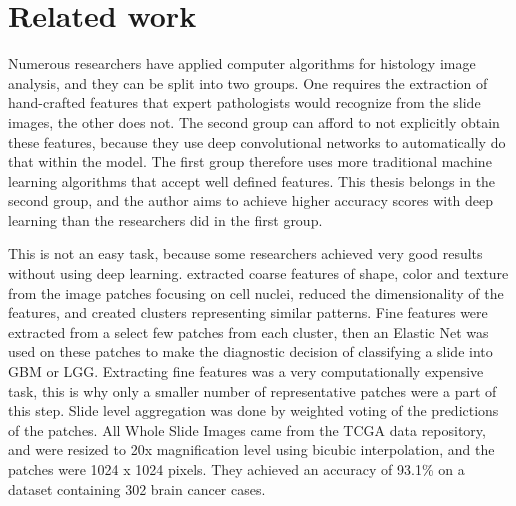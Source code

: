 
\chapter{Related work}
\label{cha:related_work}

Numerous researchers have applied computer algorithms for histology image analysis, and they can be split into two groups. One requires the extraction of hand-crafted features that expert pathologists would recognize from the slide images, the other does not. The second group can afford to not explicitly obtain these features, because they use deep convolutional networks to automatically do that within the model. The first group therefore uses more traditional machine learning algorithms that accept well defined features. This thesis belongs in the second group, and the author aims to achieve higher accuracy scores with deep learning than the researchers did in the first group.

This is not an easy task, because some researchers achieved very good results without using deep learning. \cite{BARKER201660} extracted coarse features of shape, color and texture from the image patches focusing on cell nuclei, reduced the dimensionality of the features, and created clusters representing similar patterns. Fine features were extracted from a select few patches from each cluster, then an Elastic Net was used on these patches to make the diagnostic decision of classifying a slide into GBM or LGG. Extracting fine features was a very computationally expensive task, this is why only a smaller number of representative patches were a part of this step. Slide level aggregation was done by weighted voting of the predictions of the patches. All Whole Slide Images came from the TCGA data repository, and were resized to 20x magnification level using bicubic interpolation, and the patches were 1024 x 1024 pixels. They achieved an accuracy of 93.1\% on a dataset containing 302 brain cancer cases.

